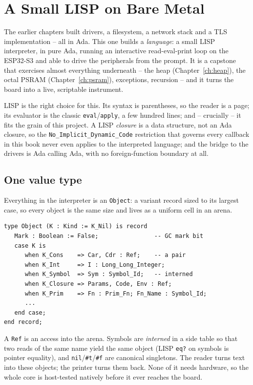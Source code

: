 \chapter{A Small LISP on Bare Metal}
\label{ch:lisp}

The earlier chapters built drivers, a filesystem, a network stack and a TLS
implementation -- all in Ada. This one builds a \emph{language}: a small LISP
interpreter, in pure Ada, running an interactive read-eval-print loop on the
ESP32-S3 and able to drive the peripherals from the prompt. It is a capstone that
exercises almost everything underneath -- the heap (Chapter~\ref{ch:heap}), the
octal PSRAM (Chapter~\ref{ch:psram}), exceptions, recursion -- and it turns the
board into a live, scriptable instrument.

LISP is the right choice for this. Its syntax is parentheses, so the reader is a
page; its evaluator is the classic \texttt{eval}/\texttt{apply}, a few hundred
lines; and -- crucially -- it fits the grain of this project. A LISP \emph{closure}
is a data structure, not an Ada closure, so the \texttt{No\_Implicit\_Dynamic\_Code}
restriction that governs every callback in this book never even applies to the
interpreted language; and the bridge to the drivers is Ada calling Ada, with no
foreign-function boundary at all.

\section{One value type}

Everything in the interpreter is an \texttt{Object}: a variant record sized to its
largest case, so every object is the same size and lives as a uniform cell in an
arena.

\begin{lstlisting}
type Object (K : Kind := K_Nil) is record
   Mark : Boolean := False;                -- GC mark bit
   case K is
      when K_Cons    => Car, Cdr : Ref;    -- a pair
      when K_Int     => I : Long_Long_Integer;
      when K_Symbol  => Sym : Symbol_Id;   -- interned
      when K_Closure => Params, Code, Env : Ref;
      when K_Prim    => Fn : Prim_Fn; Fn_Name : Symbol_Id;
      ...
   end case;
end record;
\end{lstlisting}

A \texttt{Ref} is an access into the arena. Symbols are \emph{interned} in a side
table so that two reads of the same name yield the same object (LISP \texttt{eq?}
on symbols is pointer equality), and \texttt{nil}/\texttt{\#t}/\texttt{\#f} are
canonical singletons. The reader turns text into these objects; the printer turns
them back. None of it needs hardware, so the whole core is host-tested natively
before it ever reaches the board.

